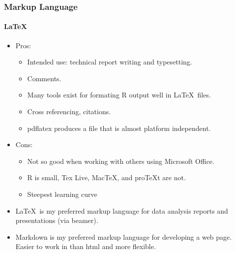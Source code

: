 \documentclass[t]{beamer}\usepackage[]{graphicx}\usepackage[]{color}
\begin{document}
\begin{frame}
  \frametitle{Markup Language}
  \framesubtitle{\LaTeX}
  \begin{itemize}
    \item Pros: 
      \begin{itemize}
        \item Intended use: technical report writing and typesetting.
        \item Comments.
        \item Many tools exist for formating R output well in \LaTeX\ files.
        \item Cross referencing, citations.
        \item pdflatex produces a file that is almost platform independent.
      \end{itemize}

    \item Cons:
      \begin{itemize}
        \item Not so good when working with others using Microsoft Office.
        \item R is small,  Tex Live, MacTeX, and proTeXt are not.
        \item Steepest learning curve
      \end{itemize}

    \item \LaTeX\ is my preferred markup language for data analysis reports and
      presentations (via beamer).

    \item Markdown is my preferred markup language for developing a web page.
      Easier to work in than html and more flexible.

  \end{itemize} 
\end{frame}
\end{document}
